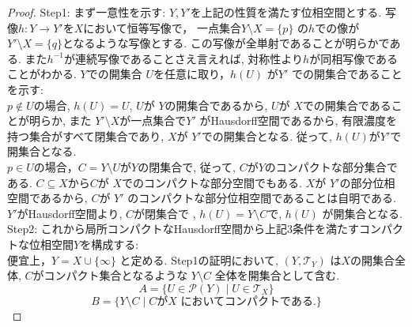 \documentclass[dvipdfmx]{jbook}
\theoremstyle{remark}
\theoremstyle{plain}
\begin{document}
\begin{proof}
	Step1: まず一意性を示す: $Y,Y'$を上記の性質を満たす位相空間とする. 
	写像$h: Y \to Y'$を$X$において恒等写像で， 
	一点集合$Y\setminus X = \{p\} $ の$h$での像が
	$Y' \setminus X = \{q\} $となるような写像とする.
	この写像が全単射であることが明らかである. 
	また$h^{-1}$が連続写像であることさえ言えれば,
	対称性より$h$が同相写像であることがわかる. 
	$Y$での開集合 $U$を任意に取り，$h\left( U \right) $ が$Y'$ での開集合であることを示す:\\
	$ p \not\in U$の場合, $h(U) =U$, $U$が $Y$の開集合であるから,  
	$U$が $X$での開集合であることが明らか, 
	また $Y ' \setminus X$が一点集合で$Y '$ がHausdorff空間であるから, 有限濃度を持つ集合がすべて閉集合であり,
	$X$が $Y'$での開集合となる. 従って, $h\left( U \right) $が$Y'$で開集合となる.\\
	$p \in U$の場合，$C = Y \setminus U$が$Y$の閉集合で, 
	従って, $C$が$Y$のコンパクトな部分集合である.
	$C \subseteq X$から$C$が $X$でのコンパクトな部分空間でもある. 
	$X$が $Y'$の部分位相空間であるから,  $C $が $Y'$ のコンパクトな部分位相空間であることは自明である.
	$Y'$がHausdorff空間より,  $C$が閉集合で , $ h\left( U \right)  = Y \setminus C$で, $h\left( U \right) $ が開集合となる.\\
	Step2: これから局所コンパクトなHausdorff空間から上記3条件を満たすコンパクトな位相空間$Y$を構成する:\\
	 便宜上，$Y = X \cup \{ \infty \} $ と定める. Step1の証明において,  $\left( Y , \mathcal{T}_{Y} \right)$ は$X$の開集合全体, $C$がコンパクト集合となるような $Y \setminus C$ 全体を開集合として含む. 
	 $$
		 A = \{U \in \mathcal{P}(Y)  \mid  U \in \mathcal{T}_X \} 
		 $$
		 $$
		 B= \{Y \setminus C  \mid \text{$C$が$X$ においてコンパクトである.}\}  
		 $$


\end{proof}
\end{document}
